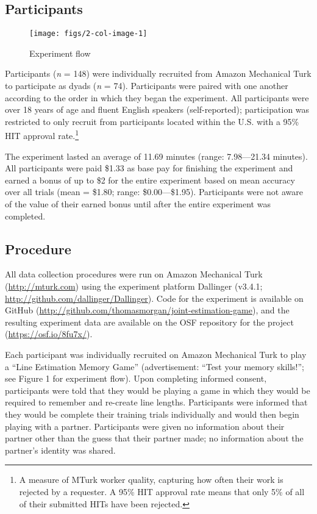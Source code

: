 \documentclass[10pt, letterpaper]{article}
\newenvironment{CodeChunk}{}{}
\begin{document}
\subsection{Participants}\label{participants}

\begin{CodeChunk}
\begin{figure*}[h]

{\centering \texttt{[image: figs/2-col-image-1]} 

}

\caption[Experiment flow]{Experiment flow}\label{fig:2-col-image}
\end{figure*}
\end{CodeChunk}

Participants (\emph{n} = 148) were individually recruited from Amazon
Mechanical Turk to participate as dyads (\emph{n} = 74). Participants
were paired with one another according to the order in which they began
the experiment. All participants were over 18 years of age and fluent
English speakers (self-reported); participation was restricted to only
recruit from participants located within the U.S. with a 95\% HIT
approval
rate.\footnote{A measure of MTurk worker quality, capturing how often their work is rejected by a requester. A 95\% HIT approval rate means that only 5\% of all of their submitted HITs have been rejected.}

The experiment lasted an average of 11.69 minutes (range: 7.98---21.34
minutes). All participants were paid \$1.33 as base pay for finishing
the experiment and earned a bonus of up to \$2 for the entire experiment
based on mean accuracy over all trials (mean = \$1.80; range:
\$0.00---\$1.95). Participants were not aware of the value of their
earned bonus until after the entire experiment was completed.

\subsection{Procedure}\label{procedure}

All data collection procedures were run on Amazon Mechanical Turk
(\url{http://mturk.com}) using the experiment platform Dallinger
(v3.4.1; \url{http://github.com/dallinger/Dallinger}). Code for the
experiment is available on GitHub
(\url{http://github.com/thomasmorgan/joint-estimation-game}), and the
resulting experiment data are available on the OSF repository for the
project (\url{https://osf.io/8fu7x/}).

Each participant was individually recruited on Amazon Mechanical Turk to
play a ``Line Estimation Memory Game'' (advertisement: ``Test your
memory skills!''; see Figure 1 for experiment flow). Upon completing
informed consent, participants were told that they would be playing a
game in which they would be required to remember and re-create line
lengths. Participants were informed that they would be complete their
training trials individually and would then begin playing with a
partner. Participants were given no information about their partner
other than the guess that their partner made; no information about the
partner's identity was shared.
\end{document}
